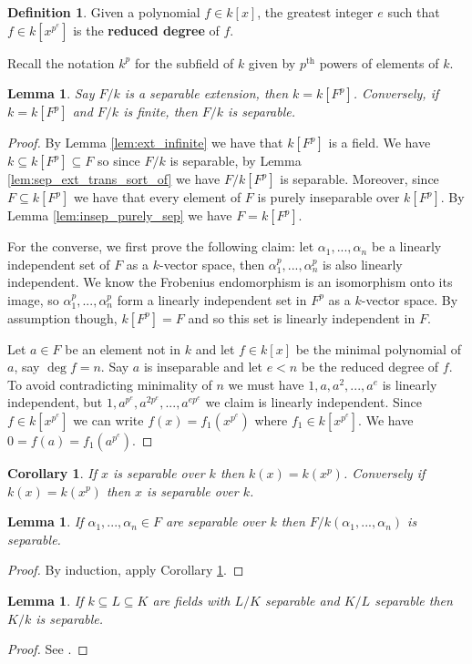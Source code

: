 \documentclass[12pt]{article}
\theoremstyle{plain}
\newtheorem{lemma}[thm]{Lemma}
\newtheorem{cor}[thm]{Corollary}
\theoremstyle{definition}
\newtheorem{defn}[thm]{Definition} %
\begin{document}
	\begin{defn}
		Given a polynomial $f \in k[x]$, the greatest integer $e$ such that $f \in k[x^{p^e}]$ is the \textbf{reduced degree} of $f$.
	\end{defn}
	Recall the notation $k^p$ for the subfield of $k$ given by $p^{\operatorname{th}}$ powers of elements of $k$.
	\begin{lemma}
		\label{lem:sep_ext_condition}
		Say $F/k$ is a separable extension, then $k = k[F^p]$. Conversely, if $k = k[F^p]$ and $F/k$ is finite, then $F/k$ is separable.
	\end{lemma}
	\begin{proof}
		By Lemma \ref{lem:ext_infinite} we have that $k[F^p]$ is a field. We have $k \subseteq k[F^p] \subseteq F$ so since $F/k$ is separable, by Lemma \ref{lem:sep_ext_trans_sort_of} we have $F/k[F^p]$ is separable. Moreover, since $F \subseteq k[F^p]$ we have that every element of $F$ is purely inseparable over $k[F^p]$. By Lemma \ref{lem:insep_purely_sep} we have $F = k[F^p]$.
		
		For the converse, we first prove the following claim: let $\alpha_1,...,\alpha_n$ be a linearly independent set of $F$ as a $k$-vector space, then $\alpha_1^p,...,\alpha_n^p$ is also linearly independent. We know the Frobenius endomorphism is an isomorphism onto its image, so $\alpha_1^p,...,\alpha_n^p$ form a linearly independent set in $F^p$ as a $k$-vector space. By assumption though, $k[F^p] = F$ and so this set is linearly independent in $F$.
		
		Let $a \in F$ be an element not in $k$ and let $f \in k[x]$ be the minimal polynomial of $a$, say $\operatorname{deg}f = n$. Say $a$ is inseparable and let $e < n$ be the reduced degree of $f$. To avoid contradicting minimality of $n$ we must have $1, a, a^2,..., a^e$ is linearly independent, but $1,a^{p^e},a^{2p^e},...,a^{ep^e}$ we claim is linearly independent. Since $f \in k[x^{p^e}]$ we can write $f(x) = f_1(x^{p^e})$ where $f_1 \in k[x^{p^e}]$. We have $0 = f(a) = f_1(a^{p^e})$.
	\end{proof}
	\begin{cor}
		\label{cor:base_induct}
		If $x$ is separable over $k$ then $k(x) = k(x^p)$. Conversely if $k(x) = k(x^p)$ then $x$ is separable over $k$.
	\end{cor}
	\begin{lemma}
		\label{lem:generated}
		If $\alpha_1,...,\alpha_n \in F$ are separable over $k$ then $F/k(\alpha_1,...,\alpha_n)$ is separable.
	\end{lemma}
	\begin{proof}
		By induction, apply Corollary \ref{cor:base_induct}.
	\end{proof}
	\begin{lemma}
		\label{lem:separable_ext_transitive} If $k \subseteq L \subseteq K$ are fields with $L/K$ separable and $K/L$ separable then $K/k$ is separable.
	\end{lemma}
	\begin{proof}
		See \cite[II \S 5, 9]{Zariski}.
	\end{proof}
\end{document}
